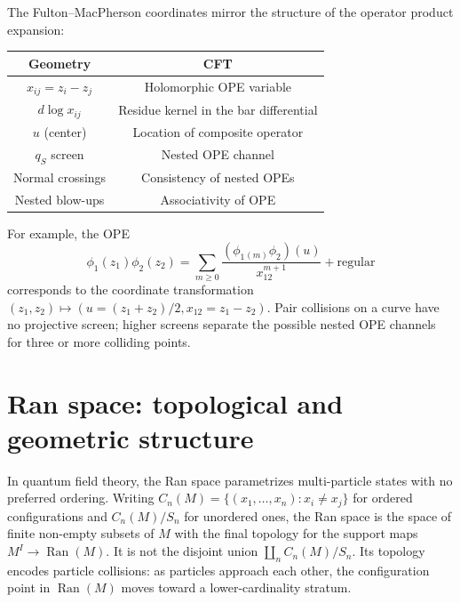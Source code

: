\begin{remark}\label{rem:coordinates-ope}
The Fulton--MacPherson coordinates mirror the structure of the operator
product expansion:

\begin{center}
\begin{tabular}{c|c}
Geometry & CFT \\
\hline
$x_{ij}=z_i-z_j$ & Holomorphic OPE variable \\
$d\log x_{ij}$ & Residue kernel in the bar differential \\
$u$ (center) & Location of composite operator \\
$q_S$ screen & Nested OPE channel \\
Normal crossings & Consistency of nested OPEs \\
Nested blow-ups & Associativity of OPE
\end{tabular}
\end{center}

For example, the OPE
\[
\phi_1(z_1)\phi_2(z_2)
=\sum_{m\geq0}\frac{(\phi_1{}_{(m)}\phi_2)(u)}{x_{12}^{m+1}}
+\text{regular}
\]
corresponds to the coordinate transformation
$(z_1,z_2)\mapsto (u=(z_1+z_2)/2,x_{12}=z_1-z_2)$.
Pair collisions on a curve have no projective screen; higher screens
separate the possible nested OPE channels for three or more colliding
points.
\end{remark}

\section{Ran space: topological and geometric structure}
\label{sec:ran-space-complete}

\begin{remark}
In quantum field theory, the Ran space parametrizes multi-particle states
with no preferred ordering. Writing $C_n(M) = \{(x_1, \ldots, x_n) : x_i \neq x_j\}$
for ordered configurations and $C_n(M)/S_n$ for unordered ones, the
Ran space is the space of finite non-empty subsets of $M$ with the final
topology for the support maps $M^I\to\operatorname{Ran}(M)$. It is not
the disjoint union
$\coprod_n C_n(M)/S_n$.
Its topology encodes particle collisions: as particles approach each other, the
configuration point in $\operatorname{Ran}(M)$ moves toward a lower-cardinality stratum.
\end{remark}

